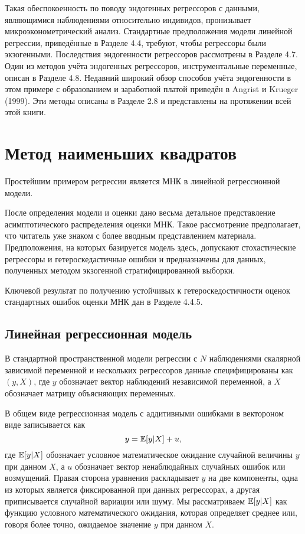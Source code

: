 Такая обеспокоенность по поводу эндогенных регрессоров с данными, являющимися наблюдениями относительно индивидов, пронизывает микроэконометрический анализ. Стандартные предположения модели линейной регрессии, приведённые в Разделе 4.4, требуют, чтобы регрессоры были экзогенными. Последствия эндогенности регрессоров рассмотрены в Разделе 4.7. Один из методов учёта эндогенных регрессоров, инструментальные переменные, описан в Разделе 4.8. Недавний широкий обзор способов учёта эндогенности в этом примере с образованием и заработной платой приведён в Angrist и Krueger (1999). Эти методы описаны в Разделе 2.8 и представлены на протяжении всей этой книги.


\section{Метод наименьших квадратов}

Простейшим примером регрессии является МНК в линейной регрессионной модели.

После определения модели и оценки дано весьма детальное представление асимптотического распределения оценки МНК. Такое рассмотрение предполагает, что читатель уже знаком с более вводным представлением материала. Предположения, на которых базируется модель здесь, допускают стохастические регрессоры и гетероскедастичные ошибки и предназначены для данных, полученных методом экзогенной стратифицированной выборки. 

Ключевой результат по получению устойчивых к гетероскедостичности оценок стандартных ошибок оценки МНК дан в Разделе 4.4.5.

\subsection{Линейная регрессионная модель}

В стандартной пространственной модели регрессии с $N$ наблюдениями скалярной зависимой переменной и нескольких регрессоров данные специфицированы как $(y,X)$, где $y$ обозначает вектор наблюдений независимой переменной, а $X$ обозначает матрицу объясняющих переменных.

В общем виде регрессионная модель с аддитивными ошибками в вектороном виде записывается как 
\begin{equation}
y = \mathbb{E}{[y|X]}+u,
\end{equation}
где $\mathbb{E}{[y|X]}$ обозначает условное математическое ожидание случайной величины $y$ при данном $X$, а $u$ обозначает вектор ненаблюдайных случайных ошибок или возмущений. Правая сторона уравнения раскладывает $y$ на две компоненты, одна из которых является фиксированной при данных регрессорах, а другая приписывается случайной вариации или шуму. Мы рассматриваем $\mathbb{E}{[y|X]}$ как функцию условного математического ожидания, которая определяет среднее или, говоря более точно, ожидаемое значение $y$ при данном $X$. 

